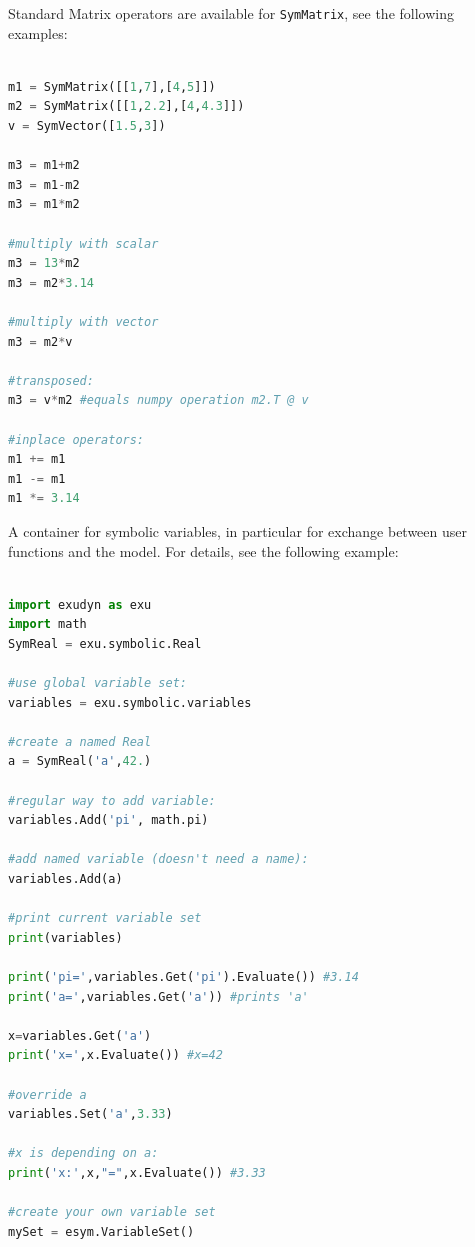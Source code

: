 Standard Matrix operators are available for \texttt{SymMatrix}, see the following examples:
\pythonstyle
\begin{lstlisting}[language=Python, firstnumber=1]

m1 = SymMatrix([[1,7],[4,5]])
m2 = SymMatrix([[1,2.2],[4,4.3]])
v = SymVector([1.5,3])

m3 = m1+m2
m3 = m1-m2
m3 = m1*m2

#multiply with scalar
m3 = 13*m2
m3 = m2*3.14

#multiply with vector
m3 = m2*v

#transposed:
m3 = v*m2 #equals numpy operation m2.T @ v

#inplace operators:
m1 += m1
m1 -= m1
m1 *= 3.14
\end{lstlisting}





A container for symbolic variables, in particular for exchange between user functions and the model. For details, see the following example:
\pythonstyle
\begin{lstlisting}[language=Python, firstnumber=1]

import exudyn as exu
import math
SymReal = exu.symbolic.Real

#use global variable set:
variables = exu.symbolic.variables

#create a named Real
a = SymReal('a',42.)

#regular way to add variable:
variables.Add('pi', math.pi)

#add named variable (doesn't need a name):
variables.Add(a)

#print current variable set
print(variables)

print('pi=',variables.Get('pi').Evaluate()) #3.14
print('a=',variables.Get('a')) #prints 'a'

x=variables.Get('a')
print('x=',x.Evaluate()) #x=42

#override a
variables.Set('a',3.33)

#x is depending on a:
print('x:',x,"=",x.Evaluate()) #3.33

#create your own variable set
mySet = esym.VariableSet()
\end{lstlisting}

